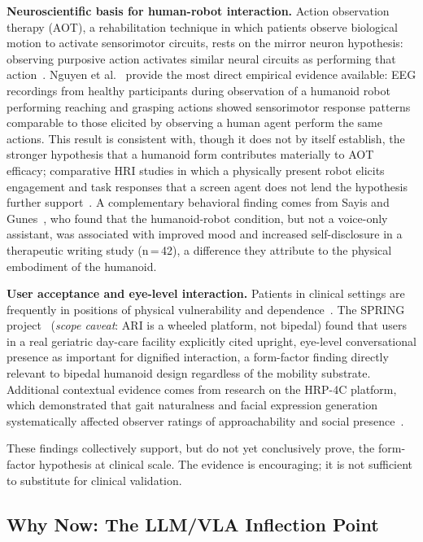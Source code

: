 \textbf{Neuroscientific basis for human-robot interaction.} Action observation
therapy (AOT), a rehabilitation technique in which patients observe biological
motion to activate sensorimotor circuits, rests on the mirror neuron hypothesis:
observing purposive action activates similar neural circuits as performing that
action~\cite{rizzolatti2004mirror}. Nguyen et al.~\cite{nguyen2024eeg} provide the most direct empirical
evidence available: EEG recordings from healthy participants during observation of
a humanoid robot performing reaching and grasping actions showed sensorimotor
response patterns comparable to those elicited by observing a human agent perform
the same actions. This result is consistent with, though it does not by itself
establish, the stronger hypothesis that a humanoid form contributes materially to
AOT efficacy; comparative HRI studies in which a physically present robot elicits
engagement and task responses that a screen agent does not lend the hypothesis
further support~\cite{bainbridge2011benefits,li2015benefit}.
A complementary behavioral finding comes from Sayis and
Gunes~\cite{sayis2024technology}, who found that the humanoid-robot condition,
but not a voice-only assistant, was associated with improved mood and increased
self-disclosure in a therapeutic writing study (n\,=\,42), a difference they
attribute to the physical embodiment of the humanoid.

\textbf{User acceptance and eye-level interaction.} Patients in clinical settings
are frequently in positions of physical vulnerability and
dependence~\cite{gallagher2008dignity,fuseini2022dignity}.
The SPRING
project~\cite{alamedapineda2024spring} (\emph{scope caveat}: ARI is a wheeled
platform, not bipedal) found that users in a real geriatric day-care facility
explicitly cited upright, eye-level conversational presence as important for
dignified interaction, a form-factor finding directly relevant to bipedal
humanoid design regardless of the mobility substrate. Additional contextual
evidence comes from research on the HRP-4C platform, which demonstrated that
gait naturalness and facial expression generation systematically affected observer
ratings of approachability and social presence~\cite{cao2025humanoid}.

These findings collectively support, but do not yet conclusively prove, the
form-factor hypothesis at clinical scale. The evidence is encouraging; it is not
sufficient to substitute for clinical validation.

\subsection{Why Now: The LLM/VLA Inflection Point}
\label{sec:llm}

